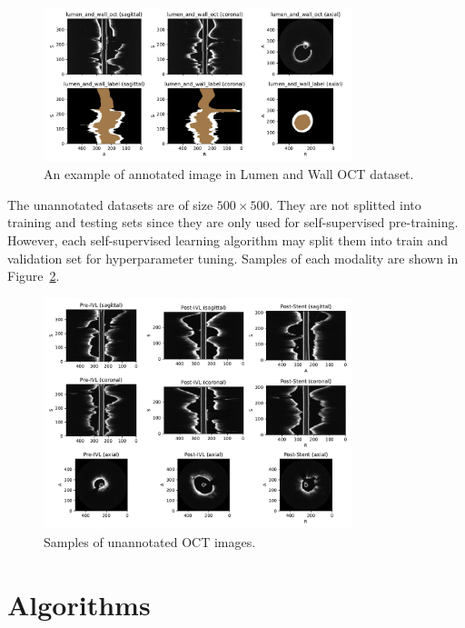 \documentclass[a4paper,11pt,oneside]{report}
\begin{document}
\begin{figure}[ht]
    \centering
    \includegraphics[width=0.8\textwidth]{figures/fig_datasets_law_oct_sample.pdf}
    \caption{An example of annotated image in Lumen and Wall OCT dataset.}
    \label{fig:lumen-and-wall-oct}
\end{figure}

The unannotated datasets are of size $500\times 500$. They are not splitted into training and testing sets since they are only used for self-supervised pre-training. However, each self-supervised learning algorithm may split them into train and validation set for hyperparameter tuning. Samples of each modality are shown in Figure~\ref{fig:unannotated-oct}. 

\begin{figure}[ht]
    \centering
    \includegraphics[width=0.8\textwidth]{figures/fig_datasets_unlabeled_oct_sample.pdf}
    \caption{Samples of unannotated OCT images.}
    \label{fig:unannotated-oct}
\end{figure}
\section{Algorithms}
\end{document}
